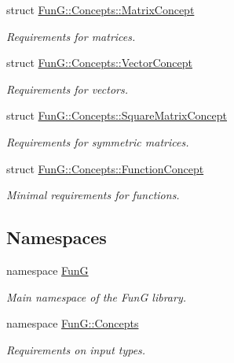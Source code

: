 \begin{DoxyCompactItemize}
struct \hyperlink{structFunG_1_1Concepts_1_1MatrixConcept}{\-Fun\-G\-::\-Concepts\-::\-Matrix\-Concept}
\begin{DoxyCompactList}\small\item\em \-Requirements for matrices. \end{DoxyCompactList}\item 
struct \hyperlink{structFunG_1_1Concepts_1_1VectorConcept}{\-Fun\-G\-::\-Concepts\-::\-Vector\-Concept}
\begin{DoxyCompactList}\small\item\em \-Requirements for vectors. \end{DoxyCompactList}\item 
struct \hyperlink{structFunG_1_1Concepts_1_1SquareMatrixConcept}{\-Fun\-G\-::\-Concepts\-::\-Square\-Matrix\-Concept}
\begin{DoxyCompactList}\small\item\em \-Requirements for symmetric matrices. \end{DoxyCompactList}\item 
struct \hyperlink{structFunG_1_1Concepts_1_1FunctionConcept}{\-Fun\-G\-::\-Concepts\-::\-Function\-Concept}
\begin{DoxyCompactList}\small\item\em \-Minimal requirements for functions. \end{DoxyCompactList}\end{DoxyCompactItemize}
\subsection*{\-Namespaces}
\begin{DoxyCompactItemize}
\item 
namespace \hyperlink{namespaceFunG}{\-Fun\-G}
\begin{DoxyCompactList}\small\item\em \-Main namespace of the \-Fun\-G library. \end{DoxyCompactList}\item 
namespace \hyperlink{namespaceFunG_1_1Concepts}{\-Fun\-G\-::\-Concepts}
\begin{DoxyCompactList}\small\item\em \-Requirements on input types. \end{DoxyCompactList}\end{DoxyCompactItemize}
